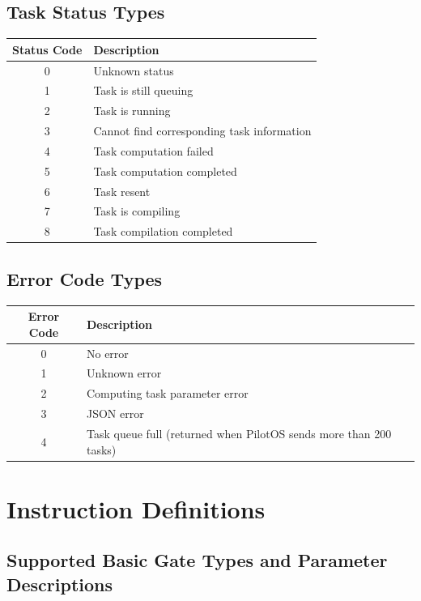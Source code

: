 \documentclass[12pt, a4paper]{article}
\begin{document}
\subsection{Task Status Types}

\begin{center}
\begin{longtable}{|c|p{12cm}|}
\hline
\textbf{Status Code} & \textbf{Description} \\ \hline
\endhead
0 & Unknown status \\ \hline
1 & Task is still queuing \\ \hline
2 & Task is running \\ \hline
3 & Cannot find corresponding task information \\ \hline
4 & Task computation failed \\ \hline
5 & Task computation completed \\ \hline
6 & Task resent \\ \hline
7 & Task is compiling \\ \hline
8 & Task compilation completed \\ \hline
\end{longtable}
\end{center}

\subsection{Error Code Types}

\begin{center}
\begin{longtable}{|c|p{12cm}|}
\hline
\textbf{Error Code} & \textbf{Description} \\ \hline
\endhead
0 & No error \\ \hline
1 & Unknown error \\ \hline
2 & Computing task parameter error \\ \hline
3 & JSON error \\ \hline
4 & Task queue full (returned when PilotOS sends more than 200 tasks) \\ \hline
\end{longtable}
\end{center}


\section{Instruction Definitions}

\subsection{Supported Basic Gate Types and Parameter Descriptions}
\end{document}
